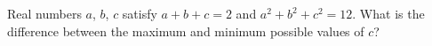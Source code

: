 Real numbers $a$, $b$, $c$ satisfy $a+b+c=2$ and $a^2+b^2+c^2=12$. What is the difference between the maximum and minimum possible values of $c$?

